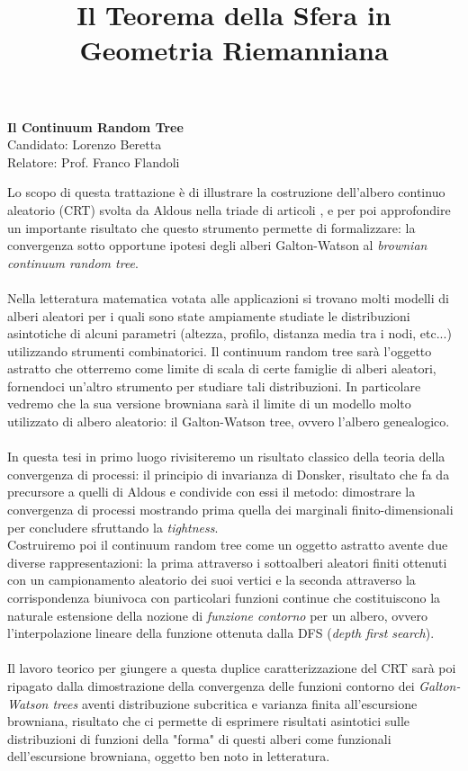 \documentclass[a4paper,10pt,openright]{report}
\title{Il Teorema della Sfera in Geometria Riemanniana}
\author{}
\theoremstyle{plain}
\theoremstyle{definition}
\begin{document}
\begin{center}
 \textbf{\large{Il Continuum Random Tree}}\\
\vspace{.3cm}
Candidato: Lorenzo Beretta\\
Relatore: Prof. Franco Flandoli\\
\end{center}
\vspace{.5cm}

Lo scopo di questa trattazione è di illustrare la costruzione dell'albero continuo aleatorio (CRT) svolta da Aldous nella triade di articoli \cite{Ald1},\cite{Ald2} e \cite{Ald3} per poi approfondire un importante risultato che questo strumento permette di formalizzare: la convergenza sotto opportune ipotesi degli alberi Galton-Watson al \textit{brownian continuum random tree}.\\
\\
Nella letteratura matematica votata alle applicazioni si trovano molti modelli di alberi aleatori per i quali sono state ampiamente studiate le distribuzioni asintotiche di alcuni parametri (altezza, profilo, distanza media tra i nodi, etc...) utilizzando strumenti combinatorici.
Il continuum random tree sarà l'oggetto astratto che otterremo come limite di scala di certe famiglie di alberi aleatori, fornendoci un'altro strumento per studiare tali distribuzioni. In particolare vedremo che la sua versione browniana sarà il limite di un modello molto utilizzato di albero aleatorio: il Galton-Watson tree, ovvero l'albero genealogico.\\
\\
In questa tesi in primo luogo rivisiteremo un risultato classico della teoria della convergenza di processi: il principio di invarianza di Donsker, risultato che fa da precursore a quelli di Aldous e condivide con essi il metodo: dimostrare la convergenza di processi mostrando prima quella dei marginali finito-dimensionali per concludere sfruttando la \textit{tightness}.\\
Costruiremo poi il continuum random tree come un oggetto astratto avente due diverse rappresentazioni: la prima attraverso i sottoalberi aleatori finiti ottenuti con un campionamento aleatorio dei suoi vertici e la seconda attraverso la corrispondenza biunivoca con particolari funzioni continue che costituiscono la naturale estensione della nozione di \textit{funzione contorno} per un albero, ovvero l'interpolazione lineare della funzione ottenuta dalla DFS (\textit{depth first search}).\\
\\
Il lavoro teorico per giungere a questa duplice caratterizzazione del CRT sarà poi ripagato dalla dimostrazione della convergenza delle funzioni contorno dei \textit{Galton-Watson trees} aventi distribuzione subcritica e varianza finita all'escursione browniana, risultato che ci permette di esprimere risultati asintotici sulle distribuzioni di funzioni della "forma" di questi alberi come funzionali dell'escursione browniana, oggetto ben noto in letteratura.
\end{document}
